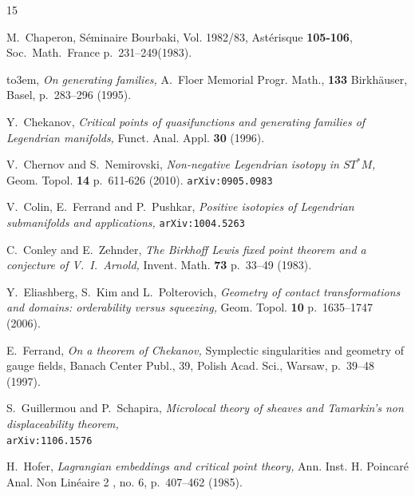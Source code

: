\documentclass[12pt,leqno]{article}
\theoremstyle{definition}
\numberwithin{equation}{section}
\begin{document}
\providecommand{\bysame}{\leavevmode\hbox to3em{\hrulefill}\thinspace}
\begin{thebibliography}{15}


 M.~Chaperon,
{\em }
S{\'e}minaire Bourbaki, Vol. 1982/83, 
Ast{\'e}risque {\bf 105-106}, Soc.\ Math.\ France p.~231--249(1983).

 \bysame,
{\em On generating families,} A.~Floer Memorial
 Progr. Math., {\bf 133} Birkh{\"a}user, Basel, p.~283--296 (1995).

 Y.~Chekanov, 
{\em Critical points of quasifunctions and 
generating families of Legendrian manifolds,} 
Funct. Anal. Appl. {\bf 30} (1996).

 V.~Chernov and S.~Nemirovski,
{\em Non-negative Legendrian isotopy in $ST^*M$,}
Geom. Topol. {\bf 14} p.~611-626 (2010).
\/\texttt{arXiv:0905.0983}

 V.~Colin, E.~Ferrand and P.~Pushkar,
{\em Positive isotopies of Legendrian submanifolds and applications,}
\/\texttt{arXiv:1004.5263}


 C.~Conley and E.~Zehnder,
{\em The Birkhoff Lewis fixed point theorem and a conjecture of V.~I.~Arnold,} 
Invent. Math. {\bf 73} p.~33--49 (1983).

 Y.~Eliashberg, S.~Kim and L.~Polterovich, 
{\em Geometry of contact transformations and domains: orderability versus
squeezing,}
Geom. Topol.  {\bf 10} p.~1635--1747  (2006).

 E.~Ferrand,
{\em On a theorem of Chekanov,}
Symplectic singularities and geometry of gauge fields,
Banach Center Publ., 39, Polish Acad. Sci., Warsaw, p.~39--48 (1997). 

 S.~Guillermou and P.~Schapira,
{\em Microlocal theory of sheaves and Tamarkin's non displaceability theorem,}\\
\/\texttt{arXiv:1106.1576}

 H.~Hofer,
{\em Lagrangian embeddings and critical point theory,}
Ann. Inst. H. Poincar{\'e} Anal. Non Lin{\'e}aire 2 , no. 6, p.~407--462 (1985).



\end{thebibliography}
\end{document}
